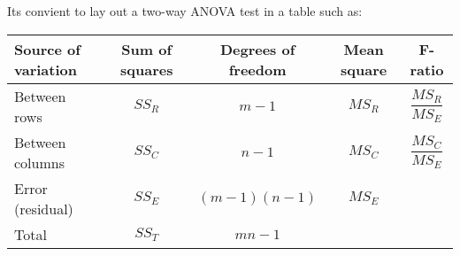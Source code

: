         Its convient to lay out a two-way ANOVA test in a table such as:
        \bgroup
        \def\arraystretch{2}
        \begin{center}
        \begin{tabular}{l|c|c|c|c}
        Source of variation & Sum of squares    & Degrees of freedom    & Mean square   & F-ratio               \\
        \hline
        Between rows        & $SS_R$            & $m-1$                 & $MS_R$        & $\dfrac{MS_R}{MS_E}$  \\
        Between columns     & $SS_C$            & $n-1$                 & $MS_C$        & $\dfrac{MS_C}{MS_E}$  \\
        Error (residual)    & $SS_E$            & $(m-1)(n-1)$          & $MS_E$        &                       \\
        \hline
        Total               & $SS_T$            & $mn-1$                &               &                       \\
        \end{tabular}
        \end{center}
        \egroup

